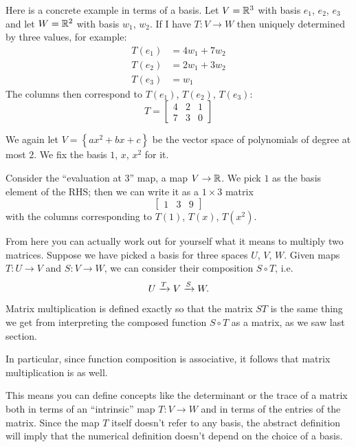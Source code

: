 \begin{example}
	Here is a concrete example in terms of a basis.
	Let $V = \mathbb R^3$ with basis $e_1$, $e_2$, $e_3$
	and let $W = \mathbb R^2$ with basis $w_1$, $w_2$.
	If I have $T \colon V \to W$
	then uniquely determined by three values, for example:
	\begin{align*}
		T(e_1) &= 4w_1 + 7w_2 \\
		T(e_2) &= 2w_1 + 3w_2 \\
		T(e_3) &= w_1
	\end{align*}
	The columns then correspond to $T(e_1)$, $T(e_2)$, $T(e_3)$:
	\[
		T =
		\begin{bmatrix}
			4 & 2 & 1 \\
			7 & 3 & 0
		\end{bmatrix}
	\]
\end{example}

\begin{example}
	We again let $V = \left\{ ax^2 + bx + c \right\}$
	be the vector space of polynomials of degree at most $2$.
	We fix the basis $1$, $x$, $x^2$ for it.

	Consider the ``evaluation at $3$'' map,
	a map $V \to \mathbb R$.
	We pick $1$ as the basis element of the RHS;
	then we can write it as a $1 \times 3$ matrix
	\[ \begin{bmatrix}
			1 & 3 & 9
		\end{bmatrix} \]
	with the columns corresponding to $T(1)$, $T(x)$, $T(x^2)$.
\end{example}

From here you can actually work out for yourself
what it means to multiply two matrices.
Suppose we have picked a basis for three spaces $U$, $V$, $W$.
Given maps $T \colon U \to V$ and $S \colon V \to W$,
we can consider their composition $S \circ T$, i.e.
\[ U \xrightarrow{T} V \xrightarrow{S} W. \]
Matrix multiplication is defined exactly so that the matrix $ST$
is the same thing we get from interpreting the composed function $S \circ T$ as a matrix,
as we saw last section.

In particular, since function composition is associative,
it follows that matrix multiplication is as well.

This means you can define concepts like the determinant or the trace of a matrix
both in terms of an ``intrinsic'' map $T \colon V \to W$
and in terms of the entries of the matrix.
Since the map $T$ itself doesn't refer to any basis,
the abstract definition will imply that the numerical definition
doesn't depend on the choice of a basis.

